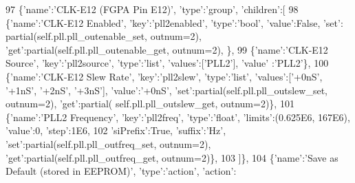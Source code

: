 \begin{DoxyCode}
97                 \{\textcolor{stringliteral}{'name'}:\textcolor{stringliteral}{'CLK-E12 (FGPA Pin E12)'}, \textcolor{stringliteral}{'type'}:\textcolor{stringliteral}{'group'}, \textcolor{stringliteral}{'children'}:[
98                     \{\textcolor{stringliteral}{'name'}:\textcolor{stringliteral}{'CLK-E12 Enabled'}, \textcolor{stringliteral}{'key'}:\textcolor{stringliteral}{'pll2enabled'}, \textcolor{stringliteral}{'type'}:\textcolor{stringliteral}{'bool'}, \textcolor{stringliteral}{'value'}:\textcolor{keyword}{False}, \textcolor{stringliteral}{'set'}:
      partial(self.pll.pll\_outenable\_set, outnum=2), \textcolor{stringliteral}{'get'}:partial(self.pll.pll\_outenable\_get, outnum=2), \},
99                     \{\textcolor{stringliteral}{'name'}:\textcolor{stringliteral}{'CLK-E12 Source'}, \textcolor{stringliteral}{'key'}:\textcolor{stringliteral}{'pll2source'}, \textcolor{stringliteral}{'type'}:\textcolor{stringliteral}{'list'}, \textcolor{stringliteral}{'values'}:[\textcolor{stringliteral}{'PLL2'}], \textcolor{stringliteral}{'value'}
      :\textcolor{stringliteral}{'PLL2'}\},
100                     \{\textcolor{stringliteral}{'name'}:\textcolor{stringliteral}{'CLK-E12 Slew Rate'}, \textcolor{stringliteral}{'key'}:\textcolor{stringliteral}{'pll2slew'}, \textcolor{stringliteral}{'type'}:\textcolor{stringliteral}{'list'}, \textcolor{stringliteral}{'values'}:[\textcolor{stringliteral}{'+0nS'}, \textcolor{stringliteral}{'+1nS'},
       \textcolor{stringliteral}{'+2nS'}, \textcolor{stringliteral}{'+3nS'}], \textcolor{stringliteral}{'value'}:\textcolor{stringliteral}{'+0nS'}, \textcolor{stringliteral}{'set'}:partial(self.pll.pll\_outslew\_set, outnum=2), \textcolor{stringliteral}{'get'}:partial(
      self.pll.pll\_outslew\_get, outnum=2)\},
101                     \{\textcolor{stringliteral}{'name'}:\textcolor{stringliteral}{'PLL2 Frequency'}, \textcolor{stringliteral}{'key'}:\textcolor{stringliteral}{'pll2freq'}, \textcolor{stringliteral}{'type'}:\textcolor{stringliteral}{'float'}, \textcolor{stringliteral}{'limits'}:(0.625E6, 167E6), \textcolor{stringliteral}{
      'value'}:0, \textcolor{stringliteral}{'step'}:1E6,
102                         \textcolor{stringliteral}{'siPrefix'}:\textcolor{keyword}{True}, \textcolor{stringliteral}{'suffix'}:\textcolor{stringliteral}{'Hz'}, \textcolor{stringliteral}{'set'}:partial(self.pll.pll\_outfreq\_set, outnum=2), \textcolor{stringliteral}{
      'get'}:partial(self.pll.pll\_outfreq\_get, outnum=2)\},
103                 ]\},
104                 \{\textcolor{stringliteral}{'name'}:\textcolor{stringliteral}{'Save as Default (stored in EEPROM)'}, \textcolor{stringliteral}{'type'}:\textcolor{stringliteral}{'action'}, \textcolor{stringliteral}{'action'}:

\end{DoxyCode}

